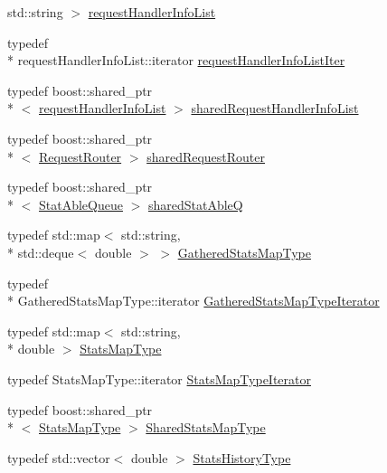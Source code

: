 \begin{DoxyCompactItemize}
std\-::string $>$ \hyperlink{namespacekisscpp_a403fe12b3fa48680ec27f8af4286383b}{request\-Handler\-Info\-List}
\item 
typedef \\*
request\-Handler\-Info\-List\-::iterator \hyperlink{namespacekisscpp_a9b5b819d32c8f71acb0a5b292303b8e1}{request\-Handler\-Info\-List\-Iter}
\item 
typedef boost\-::shared\-\_\-ptr\\*
$<$ \hyperlink{namespacekisscpp_a403fe12b3fa48680ec27f8af4286383b}{request\-Handler\-Info\-List} $>$ \hyperlink{namespacekisscpp_aa107348bd263ff2c9358b497155d37b8}{shared\-Request\-Handler\-Info\-List}
\item 
typedef boost\-::shared\-\_\-ptr\\*
$<$ \hyperlink{classkisscpp_1_1_request_router}{Request\-Router} $>$ \hyperlink{namespacekisscpp_a203bb476deb3940ecd3f21668dd3cdff}{shared\-Request\-Router}
\item 
typedef boost\-::shared\-\_\-ptr\\*
$<$ \hyperlink{classkisscpp_1_1_stat_able_queue}{Stat\-Able\-Queue} $>$ \hyperlink{namespacekisscpp_a141592ccd82280d2692ca3b9b490faab}{shared\-Stat\-Able\-Q}
\item 
typedef std\-::map$<$ std\-::string, \\*
std\-::deque$<$ double $>$ $>$ \hyperlink{namespacekisscpp_a4c76f7ad5a35f6bd51154a961f9c0d7d}{Gathered\-Stats\-Map\-Type}
\item 
typedef \\*
Gathered\-Stats\-Map\-Type\-::iterator \hyperlink{namespacekisscpp_a53ec1a09258369be8737e6ec2f93961c}{Gathered\-Stats\-Map\-Type\-Iterator}
\item 
typedef std\-::map$<$ std\-::string, \\*
double $>$ \hyperlink{namespacekisscpp_adb9e851c391ea02ff8f961f1cd37ed8c}{Stats\-Map\-Type}
\item 
typedef Stats\-Map\-Type\-::iterator \hyperlink{namespacekisscpp_a674afcb960d0097e39ef66ab83af14be}{Stats\-Map\-Type\-Iterator}
\item 
typedef boost\-::shared\-\_\-ptr\\*
$<$ \hyperlink{namespacekisscpp_adb9e851c391ea02ff8f961f1cd37ed8c}{Stats\-Map\-Type} $>$ \hyperlink{namespacekisscpp_aec223e8bce5f3988c62ceb0ccad11a68}{Shared\-Stats\-Map\-Type}
\item 
typedef std\-::vector$<$ double $>$ \hyperlink{namespacekisscpp_a4629097b5a6697a8a1eefd9ac5b0a2b6}{Stats\-History\-Type}
\item 

\end{DoxyCompactItemize}
